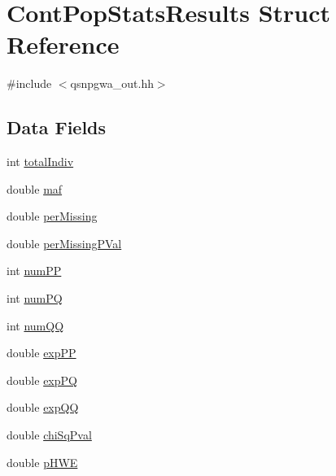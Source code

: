 \hypertarget{structContPopStatsResults}{
\section{ContPopStatsResults Struct Reference}
\label{structContPopStatsResults}
}


{\ttfamily \#include $<$qsnpgwa\_\-out.hh$>$}

\subsection*{Data Fields}
\begin{DoxyCompactItemize}
\item 
int \hyperlink{structContPopStatsResults_a04ef963080d03327b6e6d1eebe843106}{totalIndiv}
\item 
double \hyperlink{structContPopStatsResults_a8297fa29146812547bfb1ac23ba80fd0}{maf}
\item 
double \hyperlink{structContPopStatsResults_a99338d04b0d1f0c6d53a934965bb027c}{perMissing}
\item 
double \hyperlink{structContPopStatsResults_a2f6fdbe9de430b4860ab85784061433b}{perMissingPVal}
\item 
int \hyperlink{structContPopStatsResults_a5438429a5e30beea5c49f3792999acb7}{numPP}
\item 
int \hyperlink{structContPopStatsResults_afb47561b968c5afb6c4e85c127b21460}{numPQ}
\item 
int \hyperlink{structContPopStatsResults_a5aa7545d6362d7ac90f5fc5b396fd61a}{numQQ}
\item 
double \hyperlink{structContPopStatsResults_a6826b4fdd5cc538a727706f4a1715c9f}{expPP}
\item 
double \hyperlink{structContPopStatsResults_a8b1e83d6fc7022b4cb21189c658d1b87}{expPQ}
\item 
double \hyperlink{structContPopStatsResults_a37ad35b704fb592c856fdd85b17edcc6}{expQQ}
\item 
double \hyperlink{structContPopStatsResults_afd4f2dc79e759ec94b523abe36c2b7e8}{chiSqPval}
\item 
double \hyperlink{structContPopStatsResults_af9e5a8c489fe6382b04b9164087ca2fc}{pHWE}
\end{DoxyCompactItemize}



